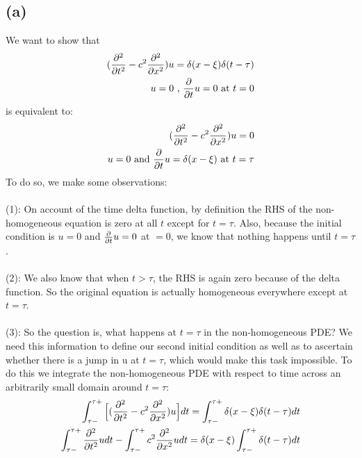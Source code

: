 \documentclass{article}
\begin{document}
\subsection*{\textbf{(a)}}
We want to show that 
\begin{equation}
\begin{aligned}
(\pdv[2]{}{t} - c^2\pdv[2]{}{x})u =\delta(x-\xi)\delta(t-\tau)\\
u = 0 \text{ , }\pdv{}{t}u = 0 \text{ at } t=0\\
\end{aligned}
\end{equation}
is equivalent to:
\begin{equation}
\begin{aligned}
(\pdv[2]{}{t} - c^2\pdv[2]{}{x})u = 0\\
u = 0 \text{ and } \pdv{}{t}u = \delta(x-\xi) \text{ at } t=\tau
\end{aligned}
\end{equation}
To do so, we make some observations: \\
\\
(1): On account of the time delta function, by definition the RHS of the non-homogeneous equation is zero at all $t$ except for $t=\tau$. Also, because the initial condition is $u=0$ and $\pdv{}{t}u = 0$ at $=0$, we know that nothing happens until $t=\tau$. \\
\\
(2): We also know that when $t>\tau$, the RHS is again zero because of the delta function. So the original equation is actually homogeneous everywhere except at $t=\tau$.\\
\\
(3): So the question is, what happens at $t=\tau$ in the non-homogeneous PDE? We need this information to define our second initial condition as well as to ascertain whether there is a jump in u at $t=\tau$, which would make this task impossible. To do this we integrate the non-homogeneous PDE with respect to time across an arbitrarily small domain around $t=\tau$:
\begin{equation}
\begin{aligned}
\int_{\tau -}^{\tau +}\Big{[} (\pdv[2]{}{t} - c^2\pdv[2]{}{x})u \Big{]}dt = \int_{\tau -}^{\tau+}\delta(x-\xi)\delta (t-\tau)dt\\
\int_{\tau -}^{\tau +}\pdv[2]{}{t}u dt - \int_{\tau -}^{\tau +}c^2\pdv[2]{}{x}u dt = \delta (x-\xi)\int_{\tau -}^{\tau+}\delta (t-\tau)dt
\end{aligned}
\end{equation}
\end{document}
